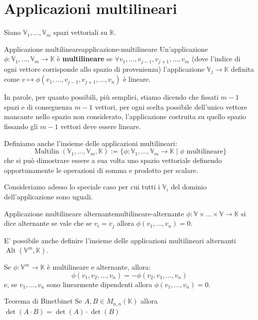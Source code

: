 \documentclass[12pt]{report}
\newcommand{\K}{\mathbb{K}}
\newcommand{\V}{\mathbb{V}}
\newcommand{\vectors}[1]{#1_1, \dots, #1_n}
\begin{document}
	\chapter{Applicazioni multilineari}
	Siano $\V_1, \dots, \V_m$ spazi vettoriali su $\K$.
	\begin{definizione}{Applicazione multilineare}{applicazione-multilineare}
		Un'applicazione $\phi: \V_1, \dots, \V_m \to \K$ è \textbf{multilineare} se $\forall v_1, \dots, v_{j-1}, v_{j+1}, \dots, v_m$ (dove l'indice di ogni vettore corrisponde allo spazio di provenienza) l'applicazione $\V_j \to \K$ definita come $v \mapsto \phi(v_1, \dots, v_{j-1}, v_{j+1}, \dots, v_n)$ è lineare.
	\end{definizione}
	In parole, per quanto possibili, più semplici, stiamo dicendo che fissati $m-1$ spazi e di conseguenza $m-1$ vettori, per ogni scelta possibile dell'unico vettore mancante nello spazio non considerato, l'applicazione costruita su quello spazio fissando gli $m-1$ vettori deve essere lineare.
	
	Definiamo anche l'insieme delle applicazioni multilineari:
	\[
		\operatorname{Multilin}(\V_1, \dots, \V_m, \K) := \{\phi: \V_1, \dots, \V_m \to \K \mid \phi \text{ multilineare}\}
	\]
	che si può dimostrare essere a sua volta uno spazio vettoriale definendo opportunamente le operazioni di somma e prodotto per scalare.
	
	Consideriamo adesso lo speciale caso per cui tutti i $\V_i$ del dominio dell'applicazione sono uguali.
	\begin{definizione}{Applicazione multilineare alternante}{multilineare-alternante}
		$\phi: \V \times \dots \times \V \to \K$ si dice alternante se vale che se $v_i = v_j$ allora $\phi(v_1, \dots, v_n) = 0$.
	\end{definizione}
	E' possibile anche definire l'insieme delle applicazioni multilineari alternanti $\operatorname{Alt}(\V^m, \K)$.
	
	\begin{osservazione}{}{}
		Se $\phi: \V^m \to \K$ è multilineare e alternante, allora:
		\[
			\phi(v_1, v_2, \dots, v_n) = -\phi(v_2, v_1, \dots, v_n)
		\]
		e, se $\vectors{v}$ sono linearmente dipendenti allora $\phi(v_1, \dots, v_n) = 0$.
	\end{osservazione}
	
	\begin{teorema}{Teorema di Binet}{binet}
		Se $A, B\in M_{n,n}(\K)$ allora $\det(A \cdot B) = \det(A) \cdot \det(B)$
	\end{teorema}
	
\end{document}
